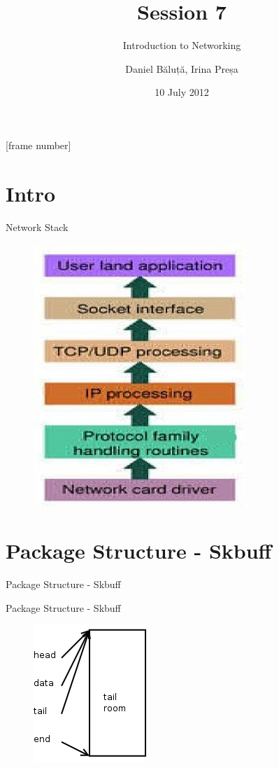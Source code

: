 \documentclass{workshop}
\title[Sesssion 7]{Session 7}
\subtitle{Introduction to Networking}
\author{Daniel Băluță, Irina Preșa}
\date{10 July 2012}
\begin{document}
[frame number]

\frame{\titlepage}

\section{Intro}
\begin{frame}{Network Stack}
\begin{figure}
  \includegraphics[scale=0.35]{img/stack.jpg}
\end{figure}
\end{frame}

\section{Package Structure - Skbuff}
\begin{frame}{Package Structure - Skbuff}

\end{frame}

\begin{frame}{Package Structure - Skbuff}

\begin{figure}
  \includegraphics[scale=0.35]{img/1.png}
\end{figure}
\end{frame}
\end{document}
